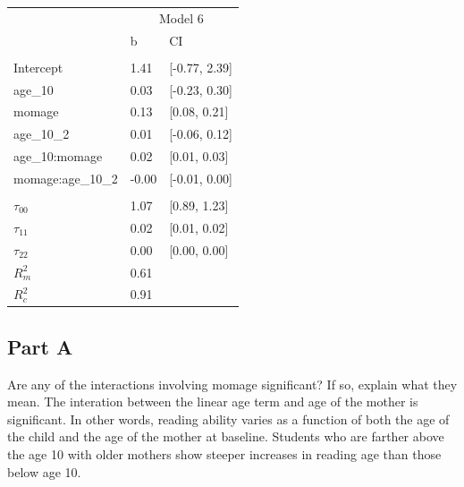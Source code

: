 \documentclass[]{article}
\begin{document}
\begin{table}[H]
\centering
\begin{tabular}{lll}
\toprule
\multicolumn{1}{c}{ } & \multicolumn{2}{c}{Model 6} \\
\cmidrule(l{2pt}r{2pt}){2-3}
 & b & CI\\
\midrule
\addlinespace[0.3em]
\multicolumn{3}{l}{\textbf{Fixed}}\\
\hspace{1em}Intercept & 1.41 & [-0.77, 2.39]\\
\hspace{1em}age\_10 & 0.03 & [-0.23, 0.30]\\
\hspace{1em}momage & 0.13 & [0.08, 0.21]\\
\hspace{1em}age\_10\_2 & 0.01 & [-0.06, 0.12]\\
\hspace{1em}age\_10:momage & 0.02 & [0.01, 0.03]\\
\hspace{1em}momage:age\_10\_2 & -0.00 & [-0.01, 0.00]\\
\addlinespace[0.3em]
\multicolumn{3}{l}{\textbf{Random}}\\
\hspace{1em}$\tau_{00}$ & 1.07 & [0.89, 1.23]\\
\hspace{1em}$\tau_{11}$ & 0.02 & [0.01, 0.02]\\
\hspace{1em}$\tau_{22}$ & 0.00 & [0.00, 0.00]\\
$R^2_m$ & 0.61 & \\
$R^2_c$ & 0.91 & \\
\bottomrule
\end{tabular}
\end{table}

\subsection{Part A}\label{part-a-3}

Are any of the interactions involving momage significant? If so, explain
what they mean. The interation between the linear age term and age of
the mother is significant. In other words, reading ability varies as a
function of both the age of the child and the age of the mother at
baseline. Students who are farther above the age 10 with older mothers
show steeper increases in reading age than those below age 10.
\end{document}
